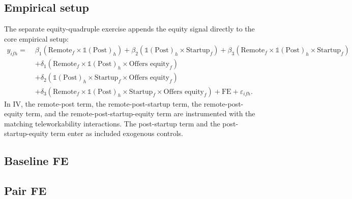 \documentclass{article}
\newcommand{\cleanedresultsdir}{../../results/cleaned/tex}
\newcommand{\TableInput}[1]{}
\newcommand{\FloatNote}[1]{%
  \begingroup
    \captionsetup{style=noteflush}%
    \caption*{\textit{Notes:}~#1}%
  \endgroup
}
\begin{document}
\subsection*{Empirical setup}
\noindent The separate equity-quadruple exercise appends the equity signal directly to the core empirical setup:
\[
  \begin{aligned}
    y_{ifh} =\; & \beta_1 \left( \text{Remote}_f \times \mathds{1}(\text{Post})_h \right)
    + \beta_2 \left( \mathds{1}(\text{Post})_h \times \text{Startup}_f \right)
    + \beta_3 \left( \text{Remote}_f \times \mathds{1}(\text{Post})_h \times \text{Startup}_f \right) \\
    & + \delta_1 \left( \text{Remote}_f \times \mathds{1}(\text{Post})_h \times \text{Offers equity}_f \right) \\
    & + \delta_2 \left( \mathds{1}(\text{Post})_h \times \text{Startup}_f \times \text{Offers equity}_f \right) \\
    & + \delta_3 \left( \text{Remote}_f \times \mathds{1}(\text{Post})_h \times \text{Startup}_f \times \text{Offers equity}_f \right)
    + \text{FE} + \varepsilon_{ifh} .
  \end{aligned}
\]
\noindent In IV, the remote-post term, the remote-post-startup term, the remote-post-equity term, and the remote-post-startup-equity term are instrumented with the matching teleworkability interactions. The post-startup term and the post-startup-equity term enter as included exogenous controls.

\subsection*{Baseline FE}
\begin{table}[H]
  \centering
  \caption{User productivity equity quadruple, baseline FE}
  \TableInput{\cleanedresultsdir/llm_equity_quadruple_baseline_fe.tex}
  \FloatNote{Column (1) is the baseline user-productivity specification. Column (2) appends the equity signal to the core empirical setup through $\text{Remote}\times\mathds{1}(\text{Post})\times\text{Offers equity}$, $\mathds{1}(\text{Post})\times\text{Startup}\times\text{Offers equity}$, and $\text{Remote}\times\mathds{1}(\text{Post})\times\text{Startup}\times\text{Offers equity}$. The remote interactions are instrumented by the matching teleworkability interactions. Standard errors are clustered by worker.}
\end{table}

\subsection*{Pair FE}
\begin{table}[H]
  \centering
  \caption{User productivity equity quadruple, pair FE}
  \TableInput{\cleanedresultsdir/llm_equity_quadruple_pair_fe.tex}
  \FloatNote{Column (1) is the pair-FE baseline specification. Column (2) appends the equity signal to the core empirical setup under firm$\times$individual and half-year fixed effects. The remote interactions are instrumented by the matching teleworkability interactions. Standard errors are clustered by worker.}
\end{table}
\end{document}
